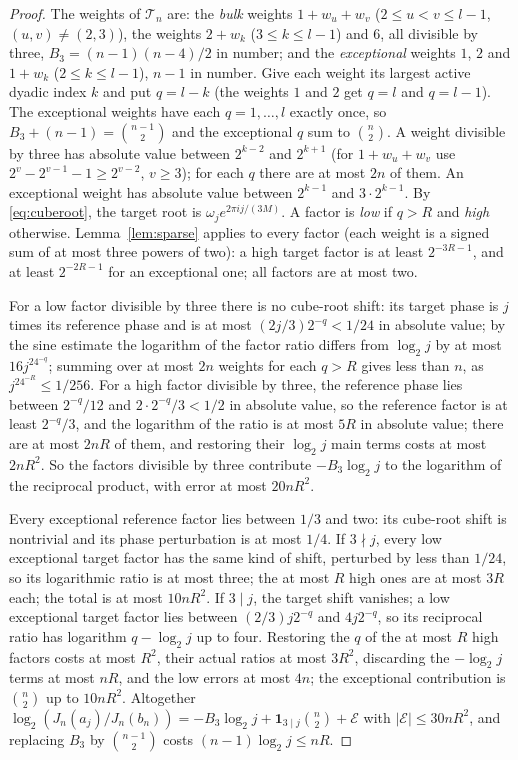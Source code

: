 \documentclass[11pt,a4paper]{article}
\theoremstyle{definition}
\begin{document}
\begin{proof}
The weights of $\mathcal T_n$ are: the \emph{bulk} weights $1+w_u+w_v$
($2\le u<v\le l-1$, $(u,v)\ne(2,3)$), the weights $2+w_k$ ($3\le k\le l-1$) and
$6$, all divisible by three, $B_3=(n-1)(n-4)/2$ in number; and the
\emph{exceptional} weights $1$, $2$ and $1+w_k$ ($2\le k\le l-1$), $n-1$ in
number. Give each weight its largest active dyadic index $k$ and put $q=l-k$
(the weights $1$ and $2$ get $q=l$ and $q=l-1$). The exceptional weights have
each $q=1,\dots,l$ exactly once, so $B_3+(n-1)=\binom{n-1}2$ and the exceptional
$q$ sum to $\binom n2$. A weight divisible by three has absolute value between
$2^{k-2}$ and $2^{k+1}$ (for $1+w_u+w_v$ use $2^v-2^{v-1}-1\ge2^{v-2}$, $v\ge3$);
for each $q$ there are at most $2n$ of them. An exceptional weight has absolute
value between $2^{k-1}$ and $3\cdot2^{k-1}$. By \eqref{eq:cuberoot}, the target
root is $\omega_je^{2\pi ij/(3M)}$. A factor is \emph{low} if $q>R$ and
\emph{high} otherwise. Lemma~\ref{lem:sparse} applies to every factor (each
weight is a signed sum of at most three powers of two): a high target factor is
at least $2^{-3R-1}$, and at least $2^{-2R-1}$ for an exceptional one; all
factors are at most two.

For a low factor divisible by three there is no cube-root shift: its target
phase is $j$ times its reference phase and is at most $(2j/3)2^{-q}<1/24$ in
absolute value; by the sine estimate the logarithm of the factor ratio differs
from $\log_2j$ by at most $16j^24^{-q}$; summing over at most $2n$ weights for
each $q>R$ gives less than $n$, as $j^24^{-R}\le1/256$. For a high factor
divisible by three, the reference phase lies between $2^{-q}/12$ and
$2\cdot2^{-q}/3<1/2$ in absolute value, so the reference factor is at least
$2^{-q}/3$, and the logarithm of the ratio is at most $5R$ in absolute value;
there are at most $2nR$ of them, and restoring their $\log_2j$ main terms costs
at most $2nR^2$. So the factors divisible by three contribute $-B_3\log_2j$ to the
logarithm of the reciprocal product, with error at most $20nR^2$.

Every exceptional reference factor lies between $1/3$ and two: its cube-root
shift is nontrivial and its phase perturbation is at most $1/4$. If $3\nmid j$,
every low exceptional target factor has the same kind of shift, perturbed by
less than $1/24$, so its logarithmic ratio is at most three; the at most $R$
high ones are at most $3R$ each; the total is at most $10nR^2$. If $3\mid j$,
the target shift vanishes; a low exceptional target factor lies between
$(2/3)j2^{-q}$ and $4j2^{-q}$, so its reciprocal ratio has logarithm $q-\log_2j$
up to four. Restoring the $q$ of the at most $R$ high factors costs at most
$R^2$, their actual ratios at most $3R^2$, discarding the $-\log_2j$ terms at
most $nR$, and the low errors at most $4n$; the exceptional contribution is
$\binom n2$ up to $10nR^2$. Altogether
$\log_2(J_n(a_j)/J_n(b_n))=-B_3\log_2j+\mathbf1_{3\mid j}\binom n2+\mathcal E$ with
$|\mathcal E|\le30nR^2$, and replacing $B_3$ by $\binom{n-1}2$ costs
$(n-1)\log_2j\le nR$.


\end{proof}
\end{document}

